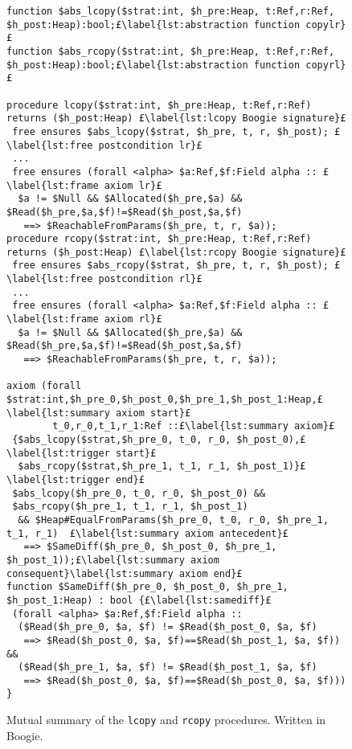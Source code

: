 \documentclass[runningheads,a4paper]{llncs}
\begin{document}
\sloppy

\begin{figure}[h!tbp]
\begin{lstlisting}[style=Boogie,firstnumber=auto,name=copyex]
function $abs_lcopy($strat:int, $h_pre:Heap, t:Ref,r:Ref, $h_post:Heap):bool;£\label{lst:abstraction function copylr}£
function $abs_rcopy($strat:int, $h_pre:Heap, t:Ref,r:Ref, $h_post:Heap):bool;£\label{lst:abstraction function copyrl}£

procedure lcopy($strat:int, $h_pre:Heap, t:Ref,r:Ref) returns ($h_post:Heap) £\label{lst:lcopy Boogie signature}£
 free ensures $abs_lcopy($strat, $h_pre, t, r, $h_post); £\label{lst:free postcondition lr}£
 ...
 free ensures (forall <alpha> $a:Ref,$f:Field alpha :: £\label{lst:frame axiom lr}£
  $a != $Null && $Allocated($h_pre,$a) && $Read($h_pre,$a,$f)!=$Read($h_post,$a,$f)
   ==> $ReachableFromParams($h_pre, t, r, $a));
procedure rcopy($strat:int, $h_pre:Heap, t:Ref,r:Ref) returns ($h_post:Heap) £\label{lst:rcopy Boogie signature}£
 free ensures $abs_rcopy($strat, $h_pre, t, r, $h_post); £\label{lst:free postcondition rl}£
 ...
 free ensures (forall <alpha> $a:Ref,$f:Field alpha :: £\label{lst:frame axiom rl}£
  $a != $Null && $Allocated($h_pre,$a) && $Read($h_pre,$a,$f)!=$Read($h_post,$a,$f)
   ==> $ReachableFromParams($h_pre, t, r, $a));

axiom (forall $strat:int,$h_pre_0,$h_post_0,$h_pre_1,$h_post_1:Heap,£\label{lst:summary axiom start}£
        t_0,r_0,t_1,r_1:Ref ::£\label{lst:summary axiom}£
 {$abs_lcopy($strat,$h_pre_0, t_0, r_0, $h_post_0),£\label{lst:trigger start}£
  $abs_rcopy($strat,$h_pre_1, t_1, r_1, $h_post_1)}£\label{lst:trigger end}£
 $abs_lcopy($h_pre_0, t_0, r_0, $h_post_0) &&
 $abs_rcopy($h_pre_1, t_1, r_1, $h_post_1)
  && $Heap#EqualFromParams($h_pre_0, t_0, r_0, $h_pre_1, t_1, r_1)  £\label{lst:summary axiom antecedent}£
   ==> $SameDiff($h_pre_0, $h_post_0, $h_pre_1, $h_post_1));£\label{lst:summary axiom consequent}\label{lst:summary axiom end}£
function $SameDiff($h_pre_0, $h_post_0, $h_pre_1, $h_post_1:Heap) : bool {£\label{lst:samediff}£
 (forall <alpha> $a:Ref,$f:Field alpha ::
  ($Read($h_pre_0, $a, $f) != $Read($h_post_0, $a, $f)
   ==> $Read($h_post_0, $a, $f)==$Read($h_post_1, $a, $f)) &&
  ($Read($h_pre_1, $a, $f) != $Read($h_post_1, $a, $f)
   ==> $Read($h_post_0, $a, $f)==$Read($h_post_0, $a, $f))) }
\end{lstlisting}
\caption{Mutual summary of the \texttt{lcopy} and \texttt{rcopy} procedures. Written in Boogie.}\label{fig:mutual summary}
\end{figure}
\end{document}
